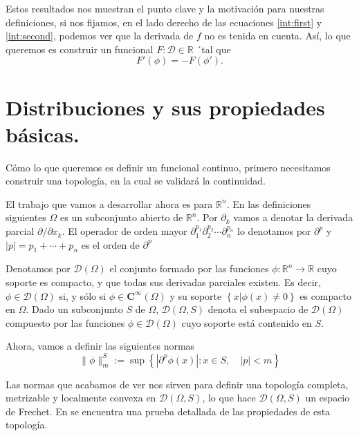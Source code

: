 \documentclass[letter,12pt]{article}
\newcommand\norm[1]{\lVert#1\rVert}
\begin{document}
Estos resultados nos muestran el punto clave y la motivación para nuestras definiciones,
si nos fijamos, en el lado derecho de las ecuaciones \ref{int:first} y
\ref{int:second}, podemos ver que la derivada de $ f $ no es tenida en cuenta.
Así, lo que queremos es construir un funcional $ F: \mathscr{D} \in \mathbb{R} $ ´tal 
que
\begin{equation}
	F'(\phi) = -F(\phi').
\end{equation}

\section{Distribuciones y sus propiedades básicas.}
Cómo lo que queremos es definir un funcional continuo, primero necesitamos construir 
una topología, en la cual se validará la continuidad.

El trabajo que vamos a desarrollar ahora es para $ \mathbb{R}^n $. En las 
definiciones siguientes $ \Omega $ es un subconjunto abierto de 
$ \mathbb{R}^n $. Por $ \partial_{k} $ vamos a denotar la derivada parcial
$ \partial/\partial{x_k} $. El operador de orden mayor 
$ \partial^{p_1}_{1} \partial^{p_2}_{2} \cdots \partial^{p_n}_{n} $ lo denotamos
por $ \partial^p $ y $ |p| = p_1 + \cdots + p_n $ es el orden de $ \partial^p $

Denotamos por $ \mathscr{D}(\Omega) $ el conjunto formado por las funciones 
$ \phi: \mathbb{R}^n \to \mathbb{R} $ cuyo soporte es compacto, y que todas sus
derivadas parciales existen. Es decir, $ \phi \in \mathscr{D}(\Omega) $ si, y sólo si
$ \phi \in \mathbf{C}^{\infty}(\Omega) $ y su soporte 
$ \left\{ x| \phi(x) \neq 0 \right\} $ es compacto en $ \Omega $.
Dado un subconjunto $ S $ de $ \Omega $, $ \mathscr{D}(\Omega, S) $ denota el 
subespacio de $ \mathscr{D}(\Omega) $ compuesto por las funciones 
$ \phi\in\mathscr{D}(\Omega) $ cuyo soporte está contenido en $ S $.

Ahora, vamos a definir las siguientes normas
\begin{equation}
 	\norm{\phi}^{S}_{m} := 
 	\sup{ \left\{ |\partial^p{\phi(x)}|: x\in S, \quad |p| < m  \right\} }
\end{equation}

Las normas que acabamos de ver nos sirven para definir una topología completa, 
metrizable y localmente convexa en $ \mathscr{D}(\Omega, S) $, lo que hace 
$ \mathscr{D}(\Omega, S) $ un espacio de Frechet. En \cite{Rudin} se encuentra 
una prueba detallada de las propiedades de esta topología.
\end{document}
